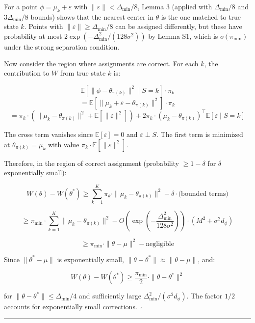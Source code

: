 \documentclass[
  12pt,
]{article}
\begin{document}
For a point \(\phi = \mu_k + \varepsilon\) with
\(\|\varepsilon\| < \Delta_{\min}/8\), Lemma 3 (applied with
\(\Delta_{\min}/8\) and \(3\Delta_{\min}/8\) bounds) shows that the
nearest center in \(\theta\) is the one matched to true state \(k\).
Points with \(\|\varepsilon\| \geq \Delta_{\min}/8\) can be assigned
differently, but these have probability at most
\(2\exp(-\Delta_{\min}^2/(128\sigma^2))\) by Lemma S1, which is
\(o(\pi_{\min})\) under the strong separation condition.

Now consider the region where assignments are correct. For each \(k\),
the contribution to \(W\) from true state \(k\) is:

\[\mathbb{E}[\|\phi - \theta_{\pi(k)}\|^2 \mid S=k] \cdot \pi_k\]
\[= \mathbb{E}[\|\mu_k + \varepsilon - \theta_{\pi(k)}\|^2] \cdot \pi_k\]
\[= \pi_k \cdot \left( \|\mu_k - \theta_{\pi(k)}\|^2 + \mathbb{E}[\|\varepsilon\|^2] \right) + 2\pi_k \cdot (\mu_k - \theta_{\pi(k)})^\top \mathbb{E}[\varepsilon \mid S=k]\]

The cross term vanishes since \(\mathbb{E}[\varepsilon] = 0\) and
\(\varepsilon \perp S\). The first term is minimized at
\(\theta_{\pi(k)} = \mu_k\) with value
\(\pi_k \cdot \mathbb{E}[\|\varepsilon\|^2]\).

Therefore, in the region of correct assignment (probability
\(\geq 1 - \delta\) for \(\delta\) exponentially small):

\[W(\theta) - W(\theta^*) \geq \sum_{k=1}^K \pi_k \cdot \|\mu_k - \theta_{\pi(k)}\|^2 - \delta \cdot \text{(bounded terms)}\]

\[\geq \pi_{\min} \cdot \sum_{k=1}^K \|\mu_k - \theta_{\pi(k)}\|^2 - O\left(\exp(-\frac{\Delta_{\min}^2}{128\sigma^2})\right) \cdot (M^2 + \sigma^2 d_\phi)\]

\[\geq \pi_{\min} \cdot \|\theta - \mu\|^2 - \text{negligible}\]

Since \(\|\theta^* - \mu\|\) is exponentially small,
\(\|\theta - \theta^*\| \approx \|\theta - \mu\|\), and:

\[W(\theta) - W(\theta^*) \geq \frac{\pi_{\min}}{2} \cdot \|\theta - \theta^*\|^2\]

for \(\|\theta - \theta^*\| \leq \Delta_{\min}/4\) and sufficiently
large \(\Delta_{\min}^2/(\sigma^2 d_\phi)\). The factor \(1/2\) accounts
for exponentially small corrections. \(\square\)

\begin{center}\rule{0.5\linewidth}{0.5pt}\end{center}
\end{document}
